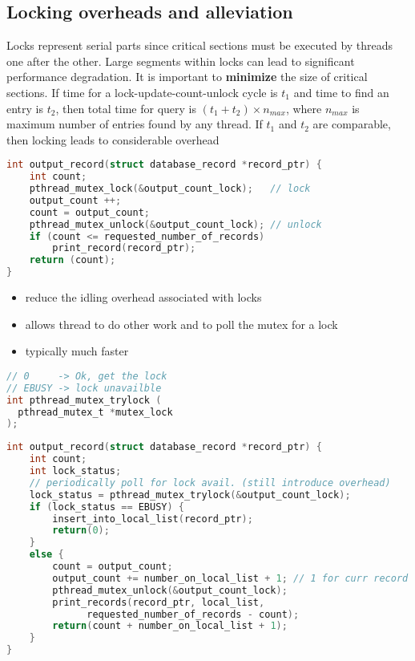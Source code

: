 \subsection*{Locking overheads and alleviation}
Locks represent serial parts since critical sections must be executed by threads one after the other.  Large segments within locks can lead to significant performance degradation. It is important to \textbf{minimize} the size of critical sections. If time for a lock-update-count-unlock cycle is $t_1$ and time to find an entry is $t_2$, then total time for query is $(t_1+t_2)\times n_{max}$, where $n_{max}$ is maximum number of entries found by any thread. If $t_1$ and $t_2$ are comparable, then locking leads to considerable overhead
\begin{lstlisting}[language=C,xleftmargin=0pt,xrightmargin=0pt]
int output_record(struct database_record *record_ptr) {
    int count;
    pthread_mutex_lock(&output_count_lock);   // lock
    output_count ++;
    count = output_count;
    pthread_mutex_unlock(&output_count_lock); // unlock
    if (count <= requested_number_of_records)
        print_record(record_ptr);
    return (count);
}
\end{lstlisting}
\begin{minipage}{0.5\linewidth}
  \flushleft
  \begin{itemize}
  \item reduce the idling overhead associated with locks
  \item allows thread to do other work and to poll the mutex for a lock
  \item typically much faster
  \end{itemize}
\end{minipage}
\begin{minipage}{0.5\linewidth}
\begin{lstlisting}[language=C,xleftmargin=0pt,xrightmargin=2pt]
// 0     -> Ok, get the lock
// EBUSY -> lock unavailble
int pthread_mutex_trylock (
  pthread_mutex_t *mutex_lock
);
\end{lstlisting}
\end{minipage}
\begin{lstlisting}[language=C,xleftmargin=0pt,xrightmargin=0pt]
int output_record(struct database_record *record_ptr) {
    int count;
    int lock_status;
    // periodically poll for lock avail. (still introduce overhead)
    lock_status = pthread_mutex_trylock(&output_count_lock);
    if (lock_status == EBUSY) {
        insert_into_local_list(record_ptr);
        return(0);
    }
    else {
        count = output_count;
        output_count += number_on_local_list + 1; // 1 for curr record
        pthread_mutex_unlock(&output_count_lock);
        print_records(record_ptr, local_list,
              requested_number_of_records - count);
        return(count + number_on_local_list + 1);
    }
}
\end{lstlisting}
